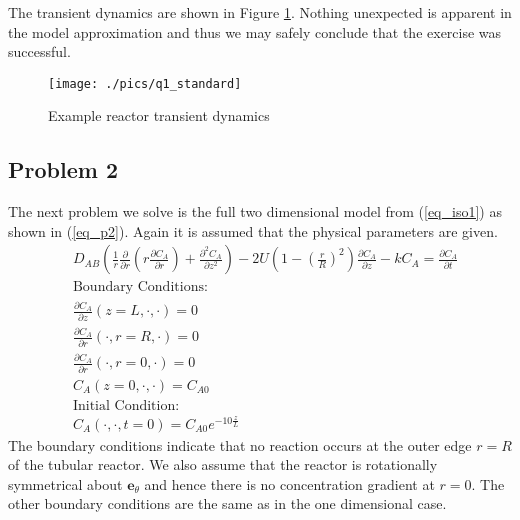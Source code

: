 \documentclass[11pt,fleqn]{article}
\theoremstyle{defstyle}
\begin{document}
The transient dynamics are shown in Figure \ref{fig_q1std}. Nothing unexpected is apparent in the model approximation and thus we may safely conclude that the exercise was successful.
\begin{figure}[H] 
\centering
\texttt{[image: ./pics/q1\_standard]}
\caption{Example reactor transient dynamics} 
\label{fig_q1std}
\end{figure}

\subsection{Problem 2}
\label{section_iso2}
The next problem we solve is the full two dimensional model from (\ref{eq_iso1}) as shown in (\ref{eq_p2}). Again it is assumed that the physical parameters are given.
\begin{equation}
\begin{aligned}
&D_{AB}\left(\frac{1}{r}\frac{\partial}{\partial r}\left(r\frac{\partial C_A}{\partial r}\right) + \frac{\partial^2 C_A}{\partial z^2}\right) - 2U\left(1-\left(\frac{r}{R}\right)^2\right)\frac{\partial C_A}{\partial z} - kC_A = \frac{\partial C_A}{\partial t}\\
&\text{Boundary Conditions:} \\
&\frac{\partial C_A}{\partial z}(z=L, \cdot, \cdot) = 0\\
&\frac{\partial C_A}{\partial r}(\cdot, r = R, \cdot) = 0 \\
&\frac{\partial C_A}{\partial r}(\cdot, r = 0, \cdot) = 0 \\
&C_A(z=0,\cdot, \cdot) = C_{A0} \\
&\text{Initial Condition:} \\
& C_A(\cdot, \cdot, t= 0) = C_{A0}e^{-10\frac{z}{L}}
\end{aligned}
\label{eq_p2}
\end{equation}
The boundary conditions indicate that no reaction occurs at the outer edge $r=R$ of the tubular reactor. We also assume that the reactor is rotationally symmetrical about $\mathbf{e}_\theta$ and hence there is no concentration gradient at $r=0$. The other boundary conditions are the same as in the one dimensional case. 
\end{document}
